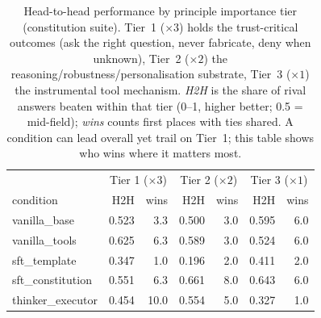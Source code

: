 \begin{table}[t]
  \centering
  \caption{Head-to-head performance by principle importance tier (constitution suite). Tier~1 ($\times 3$) holds the trust-critical outcomes (ask the right question, never fabricate, deny when unknown), Tier~2 ($\times 2$) the reasoning/robustness/personalisation substrate, Tier~3 ($\times 1$) the instrumental tool mechanism. \emph{H2H} is the share of rival answers beaten within that tier (0--1, higher better; 0.5 = mid-field); \emph{wins} counts first places with ties shared. A condition can lead overall yet trail on Tier~1; this table shows who wins where it matters most.}
  \label{tab:rank-tiers}
  \begin{tabular}{lrrrrrr}
    \toprule
    & \multicolumn{2}{c}{Tier 1 ($\times 3$)} & \multicolumn{2}{c}{Tier 2 ($\times 2$)} & \multicolumn{2}{c}{Tier 3 ($\times 1$)} \\
    condition & H2H & wins & H2H & wins & H2H & wins \\
    \midrule
    vanilla\_base & 0.523 & 3.3 & 0.500 & 3.0 & 0.595 & 6.0 \\
    vanilla\_tools & 0.625 & 6.3 & 0.589 & 3.0 & 0.524 & 6.0 \\
    sft\_template & 0.347 & 1.0 & 0.196 & 2.0 & 0.411 & 2.0 \\
    sft\_constitution & 0.551 & 6.3 & 0.661 & 8.0 & 0.643 & 6.0 \\
    thinker\_executor & 0.454 & 10.0 & 0.554 & 5.0 & 0.327 & 1.0 \\
    \bottomrule
  \end{tabular}
\end{table}
